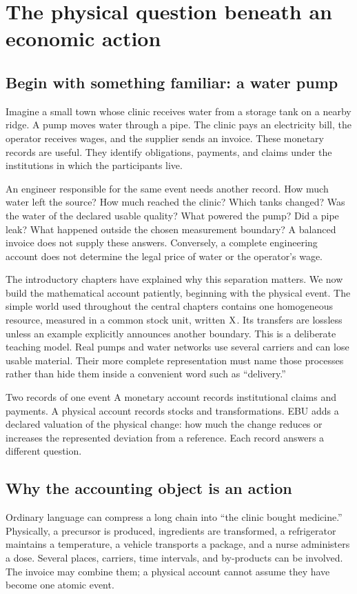 \chapter{The physical question beneath an economic action}\label{ch:action}

\section{Begin with something familiar: a water pump}
Imagine a small town whose clinic receives water from a storage tank on a nearby ridge. A pump moves water through a pipe. The clinic pays an electricity bill, the operator receives wages, and the supplier sends an invoice. These monetary records are useful. They identify obligations, payments, and claims under the institutions in which the participants live.

An engineer responsible for the same event needs another record. How much water left the source? How much reached the clinic? Which tanks changed? Was the water of the declared usable quality? What powered the pump? Did a pipe leak? What happened outside the chosen measurement boundary? A balanced invoice does not supply these answers. Conversely, a complete engineering account does not determine the legal price of water or the operator's wage.

The introductory chapters have explained why this separation matters. We now build the mathematical account patiently, beginning with the physical event. The simple world used throughout the central chapters contains one homogeneous resource, measured in a common stock unit, written \(\mathrm{X}\). Its transfers are lossless unless an example explicitly announces another boundary. This is a deliberate teaching model. Real pumps and water networks use several carriers and can lose usable material. Their more complete representation must name those processes rather than hide them inside a convenient word such as ``delivery.''

\begin{intuitionbox}{Two records of one event}
A monetary account records institutional claims and payments. A physical account records stocks and transformations. EBU adds a declared valuation of the physical change: how much the change reduces or increases the represented deviation from a reference. Each record answers a different question.
\end{intuitionbox}

\section{Why the accounting object is an action}
Ordinary language can compress a long chain into ``the clinic bought medicine.'' Physically, a precursor is produced, ingredients are transformed, a refrigerator maintains a temperature, a vehicle transports a package, and a nurse administers a dose. Several places, carriers, time intervals, and by-products can be involved. The invoice may combine them; a physical account cannot assume they have become one atomic event.

